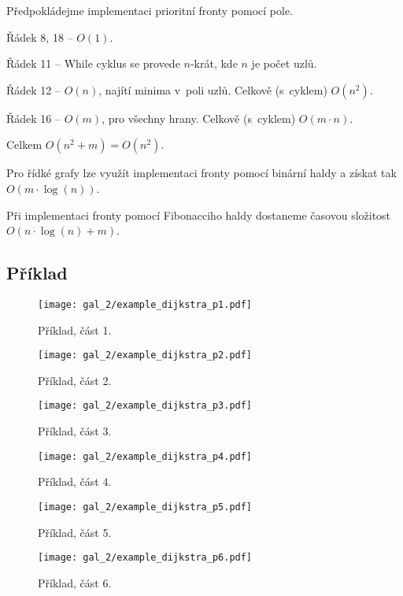 \begin{compactitem}
    \item Předpokládejme implementaci prioritní fronty pomocí pole.
    \item Řádek 8, 18 -- $O(1)$.
    \item Řádek 11 -- While cyklus se provede $n$-krát, kde $n$ je počet uzlů.
    \item Řádek 12 -- $O(n)$, najítí minima v~poli uzlů. Celkově (s~cyklem) $O(n^2)$.
    \item Řádek 16 -- $O(m)$, pro všechny hrany. Celkově (s~cyklem) $O(m \cdot n)$.
    \item Celkem $O(n^2 + m) = O(n^2)$.
    \item Pro řídké grafy lze využít implementaci fronty pomocí binární haldy a získat tak $O(m \cdot \log(n))$.
    \item Při implementaci fronty pomocí Fibonacciho haldy dostaneme časovou složitost $O(n \cdot \log(n) + m)$.
\end{compactitem}

\subsection*{Příklad}

\begin{figure}[H]
    \centering
    \texttt{[image: gal\_2/example\_dijkstra\_p1.pdf]}
    \caption{Příklad, část 1.}
\end{figure}

\begin{figure}[H]
    \centering
    \texttt{[image: gal\_2/example\_dijkstra\_p2.pdf]}
    \caption{Příklad, část 2.}
\end{figure}

\begin{figure}[H]
    \centering
    \texttt{[image: gal\_2/example\_dijkstra\_p3.pdf]}
    \caption{Příklad, část 3.}
\end{figure}

\begin{figure}[H]
    \centering
    \texttt{[image: gal\_2/example\_dijkstra\_p4.pdf]}
    \caption{Příklad, část 4.}
\end{figure}

\begin{figure}[H]
    \centering
    \texttt{[image: gal\_2/example\_dijkstra\_p5.pdf]}
    \caption{Příklad, část 5.}
\end{figure}

\begin{figure}[H]
    \centering
    \texttt{[image: gal\_2/example\_dijkstra\_p6.pdf]}
    \caption{Příklad, část 6.}
\end{figure}

